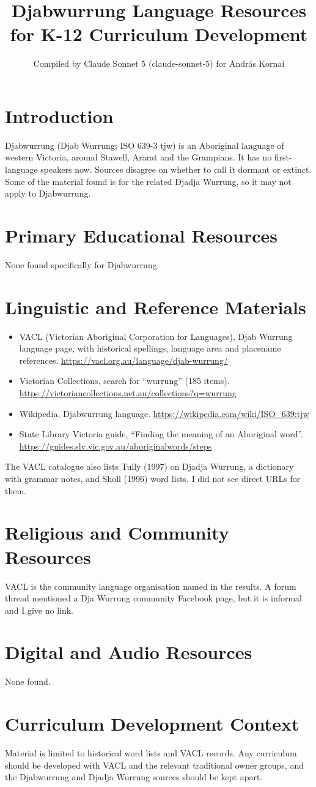 \documentclass[12pt]{article}
\title{Djabwurrung Language Resources for K-12 Curriculum Development}
\author{Compiled by Claude Sonnet 5 (claude-sonnet-5) for Andr\'as Kornai}
\date{}
\begin{document}
\maketitle
\section{Introduction}
Djabwurrung (Djab Wurrung; ISO 639-3 tjw) is an Aboriginal language of western Victoria, around Stawell, Ararat and the Grampians. It has no first-language speakers now. Sources disagree on whether to call it dormant or extinct. Some of the material found is for the related Djadja Wurrung, so it may not apply to Djabwurrung.
\section{Primary Educational Resources}
None found specifically for Djabwurrung.
\section{Linguistic and Reference Materials}
\begin{itemize}
\item VACL (Victorian Aboriginal Corporation for Languages), Djab Wurrung language page, with historical spellings, language area and placename references. \url{https://vacl.org.au/language/djab-wurrung/}
\item Victorian Collections, search for ``wurrung'' (185 items). \url{https://victoriancollections.net.au/collections?q=wurrung}
\item Wikipedia, Djabwurrung language. \url{https://wikipedia.com/wiki/ISO_639:tjw}
\item State Library Victoria guide, ``Finding the meaning of an Aboriginal word''. \url{https://guides.slv.vic.gov.au/aboriginalwords/steps}
\end{itemize}
The VACL catalogue also lists Tully (1997) on Djadja Wurrung, a dictionary with grammar notes, and Sholl (1996) word lists. I did not see direct URLs for them.
\section{Religious and Community Resources}
VACL is the community language organisation named in the results. A forum thread mentioned a Dja Wurrung community Facebook page, but it is informal and I give no link.
\section{Digital and Audio Resources}
None found.
\section{Curriculum Development Context}
Material is limited to historical word lists and VACL records. Any curriculum should be developed with VACL and the relevant traditional owner groups, and the Djabwurrung and Djadja Wurrung sources should be kept apart.
\end{document}
